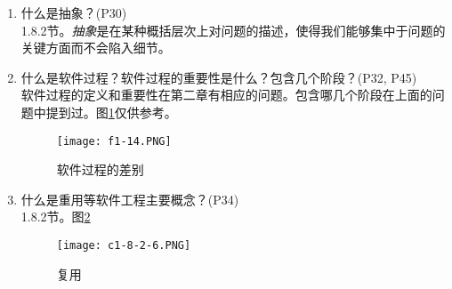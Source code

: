 \documentclass[14pt, letterpaper, UTF8, fontset=windowsnew, heading=true]{article}
\begin{document}
\begin{enumerate}

	\item
	什么是抽象？(P30)\\
	1.8.2节。\emph{抽象}是在某种概括层次上对问题的描述，使得我们能够集中于问题的关键方面而不会陷入细节。
	
	\item
	什么是软件过程？软件过程的重要性是什么？包含几个阶段？(P32, P45) \\ 
	软件过程的定义和重要性在第二章有相应的问题。包含哪几个阶段在上面的问题中提到过。图\ref{fig:procedure-differences}仅供参考。
	\begin{figure}[h]
		\centering
		\texttt{[image: f1-14.PNG]}
		\caption{软件过程的差别}
		\label{fig:procedure-differences}
	\end{figure}
	
	\item
	什么是重用等软件工程主要概念？(P34) \\ 1.8.2节。图\ref{fig:multiplexing}
	\begin{figure}[h]
		\centering
		\texttt{[image: c1-8-2-6.PNG]}
		\caption{复用}
		\label{fig:multiplexing}
	\end{figure}
	
\end{enumerate}

\end{document}
